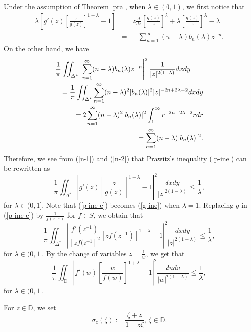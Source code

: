 \documentclass[10pt]{amsart}
\theoremstyle{definition}
\theoremstyle{remark}
\numberwithin{equation}{section}
\begin{document}
Under the assumption of  Theorem \ref{pra}, when $\lambda\in (0,1)$, we first notice that
\begin{eqnarray}\label{n-1}
\lambda\left[g'(z)\left[\frac{z}{g(z)}\right]^{1-\lambda}-1\right]&=&z\frac{d}{dz}\left[\frac{g(z)}{z}\right]^{\lambda}+\lambda\left[\frac{g(z)}{z}\right]^{\lambda}-\lambda \nonumber \\
&=&-\sum_{n=1}^{\infty}(n-\lambda)b_n(\lambda) z^{-n}.
\end{eqnarray}
On the other hand, we have
\begin{eqnarray}\label{n-2}
\lefteqn{\frac{1}{\pi}\iint_{\Delta^*}\left|\sum_{n=1}^{\infty}(n-\lambda)b_n(\lambda)  z^{-n}\right|^2 \frac{1}{|z|^{2(1-\lambda)}} dxdy} \nonumber \\
&&=\frac{1}{\pi} \iint_{\Delta^*}\sum_{n=1}^{\infty}(n-\lambda)^2|b_n(\lambda)|^2 |z|^{-2n+2\lambda-2} dxdy \nonumber \\
&&=2\sum_{n=1}^{\infty}(n-\lambda)^2|b_n(\lambda)|^2\int_{1}^{\infty}r^{-2n+2\lambda-2}rdr \nonumber \\
&&=\sum_{n=1}^{\infty}(n-\lambda)|b_n(\lambda)|^2.
\end{eqnarray}
Therefore, we see from (\ref{n-1}) and (\ref{n-2}) that Prawitz's inequality (\ref{p-ine}) can be rewritten as
\begin{equation}\label{p-ine-e}
\frac{1}{\pi}\iint_{\Delta^*}\left|g'(z)\left[\frac{z}{g(z)}\right]^{1-\lambda}-1\right|^2\frac{dxdy}{|z|^{2(1-\lambda)}}\leq \frac{1}{\lambda},
\end{equation} for $\lambda\in (0,1]$. Note that (\ref{p-ine-e}) becomes (\ref{g-ine}) when $\lambda=1$.
Replacing $g$ in (\ref{p-ine-e}) by $\frac{1}{f(z^{-1})}$ for $f\in S$, we obtain that
\begin{equation}
\frac{1}{\pi}\iint_{\Delta^*}\left|\frac{f'(z^{-1})}{[zf(z^{-1}]^2}\left[zf(z^{-1})\right]^{1-\lambda}-1\right|^2\frac{dxdy}{|z|^{2(1-\lambda)}}\leq \frac{1}{\lambda},\nonumber 
\end{equation}
for $\lambda\in (0,1]$.  
By the change of variables $z=\frac{1}{w}$, we get that
\begin{equation}\label{p-ine-d}
\frac{1}{\pi}\iint_{\mathbb{D}}\left|f'(w)\left[\frac{w}{f(w)}\right]^{1+\lambda}-1\right|^2\frac{dudv}{|w|^{2(1+\lambda)}}\leq \frac{1}{\lambda},
\end{equation}
for $\lambda\in (0,1]$. 

For $z\in \mathbb{D}$,  we set 
\begin{equation}\label{sigma}\sigma_{z}(\zeta):=\frac{\zeta+z}{1+\bar{z}\zeta}, \, \zeta \in \mathbb{D}.\end{equation}
\end{document}
